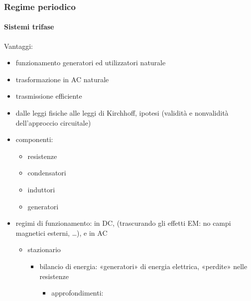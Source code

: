 \documentclass[letterpaper,10pt,italian]{jupyterBook}
\begin{document}
\subsubsection{Regime periodico}
\label{\detokenize{ch/electromagnetism/circuits-electric:regime-periodico}}

\paragraph{Sistemi trifase}
\label{\detokenize{ch/electromagnetism/circuits-electric:sistemi-trifase}}
\sphinxAtStartPar
Vantaggi:
\begin{itemize}
\item {} 
\sphinxAtStartPar
funzionamento generatori ed utilizzatori naturale

\item {} 
\sphinxAtStartPar
trasformazione in AC naturale

\item {} 
\sphinxAtStartPar
trasmissione efficiente

\item {} 
\sphinxAtStartPar
dalle leggi fisiche alle leggi di Kirchhoff, ipotesi (validità e non\sphinxhyphen{}validità dell’approccio circuitale)

\item {} 
\sphinxAtStartPar
componenti:
\begin{itemize}
\item {} 
\sphinxAtStartPar
resistenze

\item {} 
\sphinxAtStartPar
condensatori

\item {} 
\sphinxAtStartPar
induttori

\item {} 
\sphinxAtStartPar
generatori

\end{itemize}

\item {} 
\sphinxAtStartPar
regimi di funzionamento: in DC, (trascurando gli effetti EM: no campi magnetici esterni, …), e in AC
\begin{itemize}
\item {} 
\sphinxAtStartPar
stazionario
\begin{itemize}
\item {} 
\sphinxAtStartPar
bilancio di energia: «generatori» di energia elettrica, «perdite» nelle resistenze
\begin{itemize}
\item {} 
\sphinxAtStartPar
approfondimenti:


\end{itemize}
\end{itemize}
\end{itemize}
\end{itemize}
\end{document}
